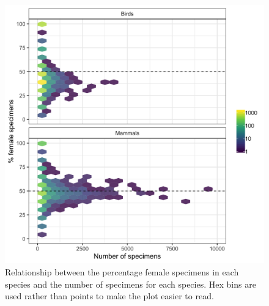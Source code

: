 \documentclass[a4paper, 12pt]{article}
\begin{document}
\begin{figure}[H]
 \centering
  \includegraphics[width = \linewidth]{figures/specimens-numbers-all.png}
  \caption{Relationship between the percentage female specimens in each species and the number of specimens for each species. 
  Hex bins are used rather than points to make the plot easier to read.}
  \label{fig-hex}
\end{figure}
\end{document}

